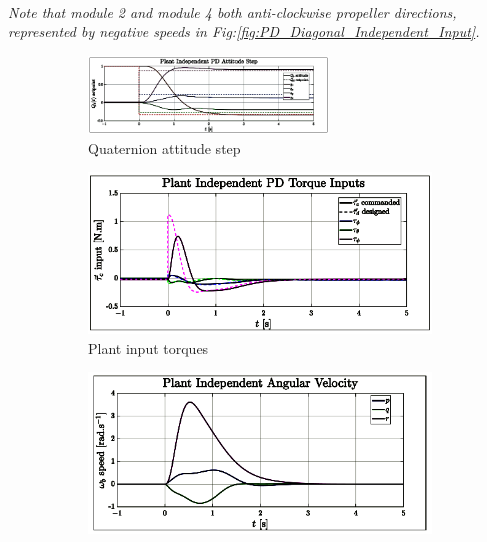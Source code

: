 \\
\emph{\color{Gray}Note that module 2 and module 4 both anti-clockwise propeller directions, represented by negative speeds in Fig:\ref{fig:PD_Diagonal_Independent_Input}. }
\\
\begin{figure}[htbp]
\vspace{-22pt}
\centering
\begin{subfigure}{\textwidth}
\centering
\includegraphics[width=0.7\textwidth]{graphs/PD_Diagonal_Independent_Step}
\vspace{-6pt}
\caption{Quaternion attitude step}
\label{fig:PD_Diagonal_Independent_Step}
\end{subfigure}
\begin{subfigure}{0.49\textwidth}
\centering
\includegraphics[width=\textwidth]{graphs/PD_Diagonal_Independent_Torque}
\vspace{-20pt}
\caption{Plant input torques}
\label{fig:PD_Diagonal_Independent_Torque}
\end{subfigure}
\begin{subfigure}{0.49\textwidth}
\centering
\includegraphics[width=\textwidth]{graphs/PD_Diagonal_Independent_Angular}

\end{subfigure}
\end{figure}
